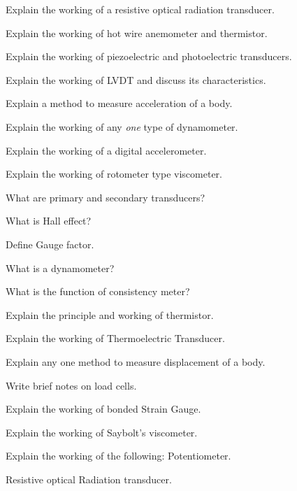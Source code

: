 \markB

\newpage \again

\partC

\item \iitem Explain the working of a resistive optical radiation
  transducer.
\Or
\item Explain the working of hot wire anemometer and thermistor.
\ene

\item \iitem Explain the working of piezoelectric and photoelectric transducers.
\Or
\item Explain the working of LVDT and discuss its characteristics.
\ene

\item \iitem Explain a method to measure acceleration of a body. 
\Or
\item Explain the working of any \emph{one} type of dynamometer.
\ene

\item \iitem Explain the working of a digital accelerometer.
\Or
\item Explain the working of rotometer type viscometer.
\ene

\markC
\ene

\newpage

\sub{\subj}
\maxtime

\partA

\iitem What are primary and secondary transducers?
\item What is Hall effect?
\item Define Gauge factor.
\item What is a dynamometer?
\item What is the function of consistency meter?

\markA
\partB

\item Explain the principle and working of thermistor.
\item Explain the working of Thermoelectric Transducer.
\item Explain any one method to measure displacement of a body.
\item Write brief notes on load cells.
\item Explain the working of bonded Strain Gauge.
\item Explain the working of Saybolt's viscometer.

\markB
\partC

\item \iitem Explain the working of the following:
\iitem Potentiometer.
\item Resistive optical Radiation transducer.
\ene
\Or


